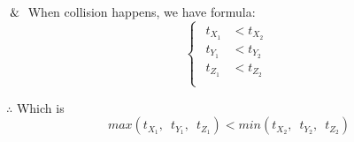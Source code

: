 $\And$ When collision happens, we have formula:
\[
\left\{
\begin{array}{lr}
\begin{aligned}
t_{X_1} &< t_{X_2}\\
t_{Y_1} &< t_{Y_2}\\
t_{Z_1} &< t_{Z_2}\\
\end{aligned}
\end{array}
\right.
\]

$\therefore$ Which is
\begin{equation}
\label{equ:ray-box-3d-intersection}
max(t_{X_1},\enspace t_{Y_1},\enspace t_{Z_1}) < min(t_{X_2},\enspace t_{Y_2},\enspace t_{Z_2})
\end{equation}

